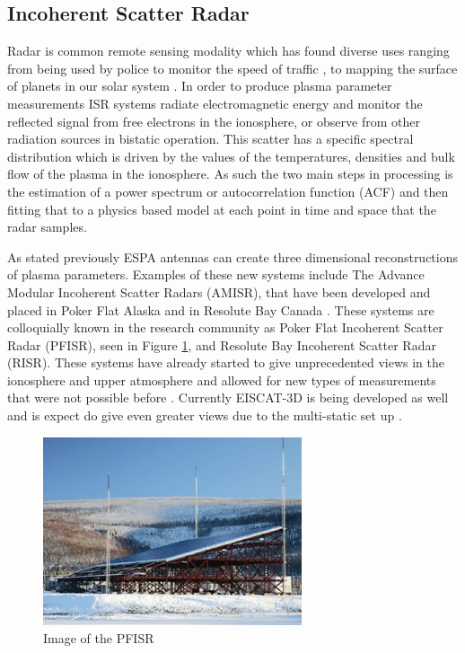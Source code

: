 \subsection{Incoherent Scatter Radar}
Radar is common remote sensing modality which has found diverse uses ranging from being used by police to monitor the speed of traffic \cite{richards2010principles}, to mapping the surface of planets in our solar system \cite{campbell2002radar}. In order to produce plasma parameter measurements ISR systems radiate electromagnetic energy and monitor the reflected signal from free electrons in the ionosphere, or observe from other radiation sources in bistatic operation. This scatter has a specific spectral distribution which is driven by the values of the temperatures, densities and bulk flow of the plasma in the ionosphere. As such the two main steps in processing is the estimation of a power spectrum or autocorrelation function (ACF) and then fitting that to a physics based model at each point in time and space that the radar samples. 

As stated previously ESPA antennas can create three dimensional reconstructions of plasma parameters. Examples of these new systems include The Advance Modular Incoherent Scatter Radars (AMISR), that have been developed and placed in Poker Flat Alaska and in Resolute Bay Canada \cite{Semeter2009738}. These systems are colloquially known in the research community as Poker Flat Incoherent Scatter Radar (PFISR), seen in Figure \ref{fig:amisrpic}, and Resolute Bay Incoherent Scatter Radar (RISR). These systems have already started to give unprecedented views in the ionosphere and upper atmosphere and allowed for new types of measurements that were not possible before \cite{semeter2010CI,butler:imagingfregiondrifts,Nicolls:2007ie}. Currently EISCAT-3D is being developed as well and is expect do give even greater views due to the multi-static set up \cite{eiscat3ddesign}.

\begin{figure}[!t]
\centering
\includegraphics[width=3in]{amisrimage}
\caption{Image of the PFISR \cite{SRIpage}}
\label{fig:amisrpic}
\end{figure}


